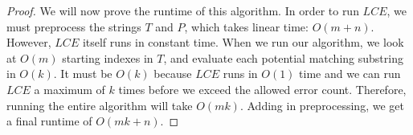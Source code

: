 \documentclass{article}
\theoremstyle{casestyle}
\begin{document}
\begin{proof}
We will now prove the runtime of this algorithm. In order to run $LCE$, we must preprocess the strings $T$ and $P$, which takes linear time: $O(m + n)$. However, $LCE$ itself runs in constant time. When we run our algorithm, we look at $O(m)$ starting indexes in $T$, and evaluate each potential matching substring in $O(k)$. It must be $O(k)$ because $LCE$ runs in $O(1)$ time and we can run $LCE$ a maximum of $k$ times before we exceed the allowed error count. Therefore, running the entire algorithm will take $O(mk)$. Adding in preprocessing, we get a final runtime of $O(mk + n)$.
\end{proof}
\end{document}
